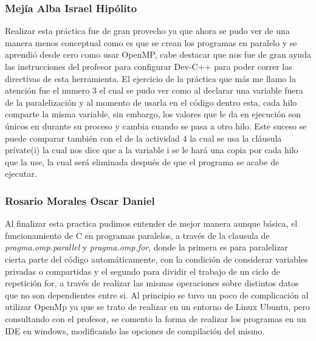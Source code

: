 \documentclass[12pt,letterpaper]{article}
\begin{document}
\subsubsection*{Mejía Alba Israel Hipólito }

Realizar esta práctica fue de gran provecho ya que ahora se pudo ver de una manera menos conceptual como es que se crean los programas en paralelo y se aprendió desde cero como usar OpenMP, cabe destacar que nos fue de gran ayuda las instrucciones del profesor para configurar Dev-C++ para poder correr las directivas de esta herramienta. El ejercicio de la práctica que más me llamo la atención fue el numero 3 el cual se pudo ver como al declarar una variable fuera de la paralelización y al momento de usarla en el código dentro esta, cada hilo comparte la misma variable, sin embargo, los valores que le da en ejecución son únicos en durante su proceso y cambia cuando se pasa a otro hilo. Este suceso se puede comparar también con el de la actividad 4 la cual se usa la cláusula prívate(i) la cual nos dice que a la variable i se le hará una copia por cada hilo que la use, la cual será eliminada después de que el programa se acabe de ejecutar.


\subsubsection*{Rosario Morales Oscar Daniel }

Al finalizar esta practica pudimos entender de mejor manera aunque básica, el funcionamiento de C en programas paralelos, a través de la clausula de \textit{pragma.omp.parallel} y \textit{pragma.omp.for},  donde la primera es para paralelizar cierta parte del código automáticamente, con la condición de considerar variables privadas o compartidas y el segundo para dividir el trabajo de un ciclo de repetición for, a través de realizar las mismas operaciones sobre distintos datos que no son dependientes entre si. Al principio se tuvo un poco de complicación al utilizar OpenMp ya que se trato de realizar en un entorno de Linux Ubuntu, pero consultando con el profesor, se comento la forma de realizar los programas en un IDE en windows, modificando las opciones de compilación del mismo. 
\end{document}
